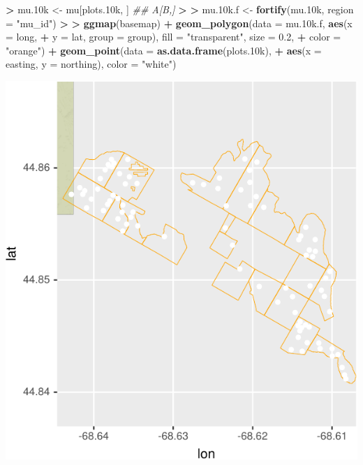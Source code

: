 \documentclass[]{krantz}
\makeatletter
\newenvironment{Shaded}{\begin{snugshade}}{\end{snugshade}}
\newcommand{\CommentTok}[1]{\textcolor[rgb]{0.37,0.37,0.37}{\textit{#1}}}
\newcommand{\DataTypeTok}[1]{\textcolor[rgb]{0.27,0.27,0.27}{#1}}
\newcommand{\ErrorTok}[1]{\textcolor[rgb]{0.14,0.14,0.14}{\textbf{#1}}}
\newcommand{\FloatTok}[1]{\textcolor[rgb]{0.06,0.06,0.06}{#1}}
\newcommand{\KeywordTok}[1]{\textcolor[rgb]{0.27,0.27,0.27}{\textbf{#1}}}
\newcommand{\NormalTok}[1]{#1}
\newcommand{\OperatorTok}[1]{\textcolor[rgb]{0.43,0.43,0.43}{\textbf{#1}}}
\newcommand{\StringTok}[1]{\textcolor[rgb]{0.5,0.5,0.5}{#1}}
\newenvironment{kframe}{%
\medskip{}
\setlength{\fboxsep}{.8em}
 \def\at@end@of@kframe{}%
 \ifinner\ifhmode%
  \def\at@end@of@kframe{\end{minipage}}%
  \begin{minipage}{\columnwidth}%
 \fi\fi%
 \def\FrameCommand##1{\hskip\@totalleftmargin \hskip-\fboxsep
 \colorbox{shadecolor}{##1}\hskip-\fboxsep
     \hskip-\linewidth \hskip-\@totalleftmargin \hskip\columnwidth}%
 \MakeFramed {\advance\hsize-\width
   \@totalleftmargin\z@ \linewidth\hsize
   \@setminipage}}%
 {\par\unskip\endMakeFramed%
 \at@end@of@kframe}
\renewenvironment{Shaded}{\begin{kframe}}{\end{kframe}}
\makeatother
\begin{document}
\begin{Shaded}
\begin{Highlighting}[]
\OperatorTok{>}\StringTok{ }\NormalTok{mu}\FloatTok{.10}\NormalTok{k <-}\StringTok{ }\NormalTok{mu[plots}\FloatTok{.10}\NormalTok{k, ]  }\CommentTok{## A[B,]}
\OperatorTok{>}\StringTok{ }
\ErrorTok{>}\StringTok{ }\NormalTok{mu}\FloatTok{.10}\NormalTok{k.f <-}\StringTok{ }\KeywordTok{fortify}\NormalTok{(mu}\FloatTok{.10}\NormalTok{k, }\DataTypeTok{region =} \StringTok{"mu_id"}\NormalTok{)}
\OperatorTok{>}\StringTok{ }
\ErrorTok{>}\StringTok{ }\KeywordTok{ggmap}\NormalTok{(basemap) }\OperatorTok{+}\StringTok{ }\KeywordTok{geom_polygon}\NormalTok{(}\DataTypeTok{data =}\NormalTok{ mu}\FloatTok{.10}\NormalTok{k.f, }\KeywordTok{aes}\NormalTok{(}\DataTypeTok{x =}\NormalTok{ long, }
\OperatorTok{+}\StringTok{   }\DataTypeTok{y =}\NormalTok{ lat, }\DataTypeTok{group =}\NormalTok{ group), }\DataTypeTok{fill =} \StringTok{"transparent"}\NormalTok{, }\DataTypeTok{size =} \FloatTok{0.2}\NormalTok{, }
\OperatorTok{+}\StringTok{   }\DataTypeTok{color =} \StringTok{"orange"}\NormalTok{) }\OperatorTok{+}\StringTok{ }\KeywordTok{geom_point}\NormalTok{(}\DataTypeTok{data =} \KeywordTok{as.data.frame}\NormalTok{(plots}\FloatTok{.10}\NormalTok{k), }
\OperatorTok{+}\StringTok{   }\KeywordTok{aes}\NormalTok{(}\DataTypeTok{x =}\NormalTok{ easting, }\DataTypeTok{y =}\NormalTok{ northing), }\DataTypeTok{color =} \StringTok{"white"}\NormalTok{)}
\end{Highlighting}
\end{Shaded}

\includegraphics{bookdown_files/figure-latex/unnamed-chunk-201-1.pdf}
\end{document}
